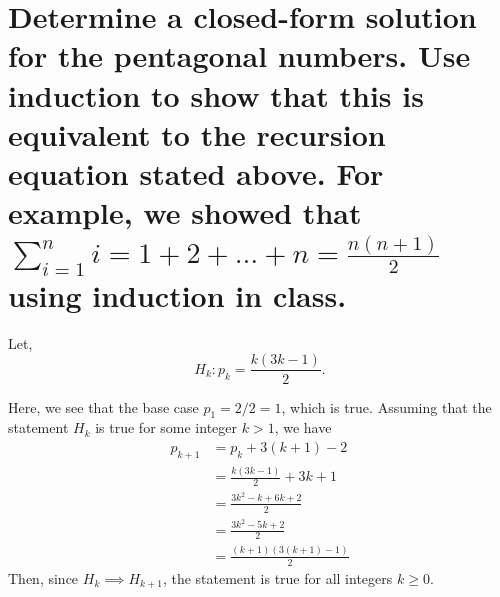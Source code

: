 \begin{parts}
\begin{solution}
    \end{solution}

    \part{
        Determine a closed-form solution for the pentagonal
        numbers.  Use induction to show that this is
        equivalent to the recursion equation stated above.
        For example, we showed that
        $\sum_{i=1}^n i=1+2+\ldots +n=\frac{n(n+1)}{2}$
        using induction in class.
    }
    \begin{solution}
        Let, 
        \begin{equation}
            H_k: p_k = \frac{k(3k-1)}{2}.
        \end{equation}

        Here, we see that the base case $p_1=2/2=1$, which
        is true. Assuming that the statement $H_k$ is true
        for some integer $k>1$, we 
        have
        \begin{align*}
            p_{k+1} &= p_k+3(k+1)-2\\
            &=\frac{k(3k-1)}{2} +3k+1\\
            &=\frac{3k^2-k+6k+2}{2}\\
            &=\frac{3k^2-5k+2}{2}\\
            &=\frac{(k+1)(3(k+1)-1)}{2}
        \end{align*}
        Then, since $H_k\implies H_{k+1}$, the statement is
        true for all integers $k\ge 0$.
    \end{solution}
\end{parts}